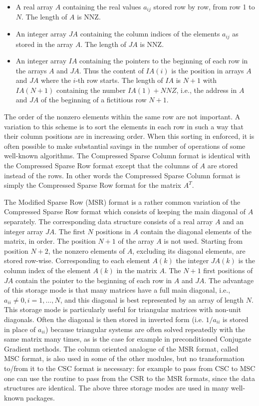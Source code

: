 \documentclass[12pt]{article}
\begin{document}
\begin{itemize} 

\item A real array $A$ containing the real values $a_{ij}$ stored row by row,
from row 1 to $N$. The length of $A$ is NNZ.

\item An integer array $JA$ containing the column indices
of the elements $a_{ij}$ as stored in the array $A$.  The length of
$JA$ is NNZ.

\item An integer array $IA$ containing the pointers to the
beginning of each row in the arrays $A$ and $JA$. Thus the content of
$IA(i)$ is the position in arrays $A$ and $JA$ where the $i$-th row
starts.  The length of $IA$ is $N+1$ with $IA(N+1)$ containing the
number $IA(1)+NNZ$, i.e., the address in $A$ and $JA$ of the beginning
of a fictitious row $N+1$.

\end{itemize}
The order of the nonzero elements within the same row are not important. 
A variation to this scheme is to sort the elements in each row 
in such a way that their column positions are in increasing order.
When this sorting in enforced, it is often possible to 
make substantial savings in the number of operations of 
some well-known algorithms. 
The Compressed Sparse Column format is identical with the Compressed
Sparse Row format except that the columns of $A$ are stored instead of
the rows. In other words the Compressed Sparse Column format is simply
the Compressed Sparse Row format for the matrix $A^T$.

The Modified Sparse Row (MSR) format is a rather common variation of
the Compressed Sparse Row format which consists of keeping the main
diagonal of $A$ separately. The corresponding data structure consists
of a real array $A$ and an integer array $JA$. The first $N$ positions
in $A$ contain the diagonal elements of the matrix, in order.  The position
$N+1$ of the array $A$ is not used. Starting from position $N+2$, the
nonzero elements of $A$, excluding its diagonal elements, are stored
row-wise. Corresponding to each element $A(k)$ the integer $JA(k)$ is
the column index of the element $A(k)$ in the matrix $A$. The $N+1$
first positions of $JA$ contain the pointer to the beginning of each
row in $A$ and $JA$. The advantage of this storage mode is that many
matrices have a full main diagonal, i.e., $a_{ii} \ne 0, i=1,\ldots,
N$, and this diagonal is best represented by an array of length $N$.
This storage mode is particularly useful for triangular matrices with
non-unit diagonals. Often the diagonal is then stored in inverted form
(i.e. $1/a_{ii} $ is stored in place of $a_{ii} $) because triangular
systems are often solved repeatedly with the same matrix many times,
as is the case for example in preconditioned Conjugate Gradient
methods.  The column oriented analogue of the MSR format, called MSC
format, is also used in some of the other modules, but no
transformation to/from it to the CSC format is necessary: for example
to pass from CSC to MSC one can use the routine to pass from the CSR
to the MSR formats, since the data structures are identical.  The 
 above three storage modes are used in many well-known packages.
\end{document}

